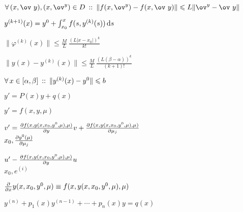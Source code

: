 \documentclass[timbord]{longnotes}
\begin{document}
\begin{list}
  \item $\forall\, (x,\ov~y), (x,\ov^y) \in D \holds \|f(x,\ov^y) - f(x,\ov~y)\|
    \leqslant L \|\ov^y - \ov~y\|$
    \skeq
  \item $y^{(k+1)} (x) = y^0 + \int_{x_0}^x f(s,y^{(k)}(s))\, \mathrm{d} s$
  \item $\|\varphi^{(k)} (x)\| \leqslant \frac{M}{L} \, \frac{(L|x-x_0|)^k}{k!}  $
  \item $\|y(x) - y^{(k)} (x) \| \leqslant \frac{M}{L} \, \frac{(L(\beta-\alpha))^k}{(k+1)!} $
  \item $\forall\, x\in[\alpha, \beta] \:::\: \|y^{(k)} (x) - y^0 \| \leqslant b$
  \item $y' = P(x) y + q(x)$
  \item $y'=f(x,y,\mu)$
    \skeq
  \item $v' = \pder{f(x,y(x,x_0,y^0,\mu),\mu)}{y} v
    + \pder{f(x,y(x,x_0,y^0,\mu),\mu)}{\mu_j}$ \\
    $x_0, \pder{y^0(\mu)}{\mu_j}$
  \item $u' - \pder{f(x,y(x,x_0,y^0,\mu),\mu)}{y} u$ \\
    $x_0, e^{(i)}$
  \item $\pder{}{x} y (x,x_0,y^0,\mu) \equiv f(x,y(x,x_0,y^0,\mu),\mu)$
\nch
  \item $y^{(n)} + p_1(x) y^{(n-1)} + \dotsb + p_n(x) y = q(x)$
\nch


\end{list}
\end{document}
